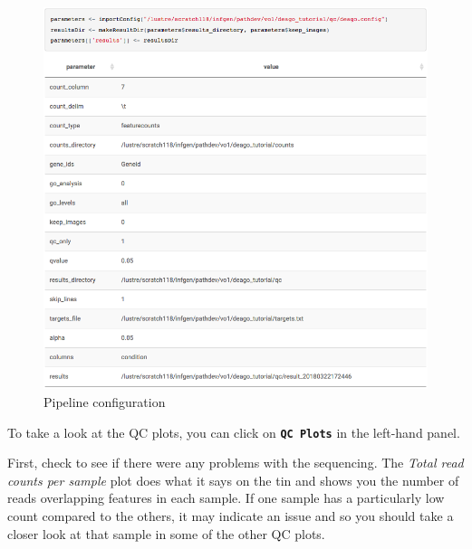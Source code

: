 \documentclass[11pt]{article}
\makeatletter
\def\maxwidth{\ifdim\Gin@nat@width>\linewidth\linewidth
    \else\Gin@nat@width\fi}
\let\Oldincludegraphics\includegraphics
\renewcommand{\includegraphics}[1]{\Oldincludegraphics[width=.8\maxwidth, height=.55\textheight, keepaspectratio]{#1}}
\makeatother
\begin{document}
    \begin{figure}[H]
\centering
\includegraphics{images/deago_parameters.png}
\caption{Pipeline configuration}
\end{figure}

    To take a look at the QC plots, you can click on
\textbf{\texttt{QC\ Plots}} in the left-hand panel.

First, check to see if there were any problems with the sequencing. The
\textit{Total read counts per sample} plot does what it says on the tin
and shows you the number of reads overlapping features in each sample.
If one sample has a particularly low count compared to the others, it
may indicate an issue and so you should take a closer look at that
sample in some of the other QC plots.
\end{document}
